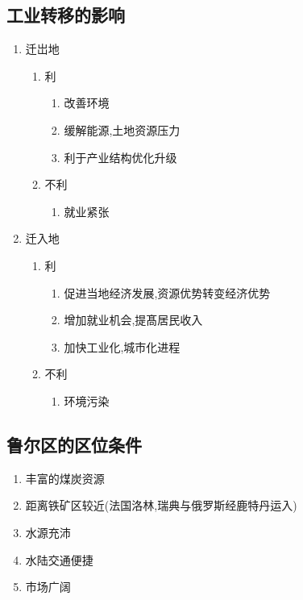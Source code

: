 \documentclass[a4paper]{article}
\begin{document}
    \subsection{工业转移的影响}
    \begin{enumerate}
        \item 迁岀地
        \begin{enumerate}
            \item 利
            \begin{enumerate}
                \item 改善环境
                \item 缓解能源,土地资源压力
                \item 利于产业结构优化升级
            \end{enumerate}
            \item 不利
            \begin{enumerate}
                \item 就业紧张
            \end{enumerate}
        \end{enumerate}
        \item 迁入地
        \begin{enumerate}
            \item 利
            \begin{enumerate}
                \item 促进当地经济发展,资源优势转变经济优势
                \item 增加就业机会,提髙居民收入
                \item 加快工业化,城市化进程
            \end{enumerate}
            \item 不利
            \begin{enumerate}
                \item 环境污染
            \end{enumerate}
        \end{enumerate}
    \end{enumerate}
    \subsection{鲁尔区的区位条件}
    \begin{enumerate}
        \item 丰富的煤炭资源
        \item 距离铁矿区较近(法国洛林,瑞典与俄罗斯经鹿特丹运入)
        \item 水源充沛
        \item 水陆交通便捷
        \item 市场广阔
    \end{enumerate}
\end{document}
